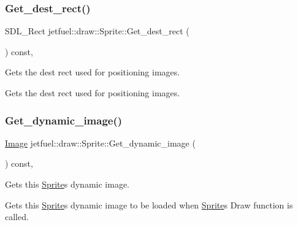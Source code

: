\subsubsection{\texorpdfstring{Get\+\_\+dest\+\_\+rect()}{Get\_dest\_rect()}}
{\footnotesize\ttfamily S\+D\+L\+\_\+\+Rect jetfuel\+::draw\+::\+Sprite\+::\+Get\+\_\+dest\+\_\+rect (\begin{DoxyParamCaption}{ }\end{DoxyParamCaption}) const\hspace{0.3cm}{\ttfamily [inline]}, {\ttfamily [protected]}}



Gets the dest rect used for positioning images. 

Gets the dest rect used for positioning images. \mbox{\label{classjetfuel_1_1draw_1_1Sprite_a9c750d8c54004aa7e9b2de82b46bdb12}} 
\subsubsection{\texorpdfstring{Get\+\_\+dynamic\+\_\+image()}{Get\_dynamic\_image()}}
{\footnotesize\ttfamily \hyperlink{classjetfuel_1_1draw_1_1Image}{Image} jetfuel\+::draw\+::\+Sprite\+::\+Get\+\_\+dynamic\+\_\+image (\begin{DoxyParamCaption}{ }\end{DoxyParamCaption}) const\hspace{0.3cm}{\ttfamily [inline]}, {\ttfamily [protected]}}



Gets this \hyperlink{classjetfuel_1_1draw_1_1Sprite}{Sprite}\textquotesingle{}s dynamic image. 

Gets this \hyperlink{classjetfuel_1_1draw_1_1Sprite}{Sprite}\textquotesingle{}s dynamic image to be loaded when \hyperlink{classjetfuel_1_1draw_1_1Sprite}{Sprite}\textquotesingle{}s Draw function is called. \mbox{\label{classjetfuel_1_1draw_1_1Sprite_a2cd3f83c4fc573be82d3dc3a9c70e317}} 
